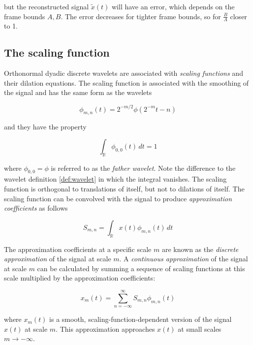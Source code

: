 but the reconstructed signal $\tilde{x}(t)$ will have an error, which depends on the frame bounds $A, B$. The error decreases for tighter frame bounds, so 
for $\frac{B}{A}$ closer to 1.

\subsection{The scaling function}
Orthonormal dyadic discrete wavelets are associated with \textit{scaling functions} and their dilation equations. The scaling function is associated with the smoothing of 
the signal and has the same form as the wavelets

\begin{equation}
    \phi_{m, n}(t) = 2^{-m/2} \phi(2^{-m}t - n)
    \label{eq:scal_func}
\end{equation}

and they have the property

\begin{equation}
    \int_{\mathbb{R}} \phi_{0,0}(t) \,dt = 1
\end{equation}

where $\phi_{0,0} = \phi$ is referred to as the \textit{father wavelet}. Note the difference to the wavelet definition \ref{def:wavelet} in which the integral vanishes.
The scaling function is orthogonal to translations of itself, but not to dilations of itself. The scaling function can be convolved with the signal to
produce \textit{approximation coefficients} as follows

\begin{equation}
    S_{m, n} = \int_{\mathbb{R}} x(t) \phi_{m, n}(t) \, dt
    \label{eq:approx_coef}
\end{equation}

The approximation coefficients at a specific scale $m$ are known as the \textit{discrete approximation} of the signal at scale $m$. A \textit{continuous approximation} of
the signal at scale $m$ can be calculated by summing a sequence of scaling functions at this scale multiplied by the approximation coefficients:

\begin{equation}
    x_{m}(t) = \sum_{n=-\infty}^{\infty} S_{m, n} \phi_{m, n}(t)
    \label{eq:contin_approx}
\end{equation}

where $x_m(t)$ is a smooth, scaling-function-dependent version of the signal $x(t)$ at scale $m$. This approximation approaches $x(t)$ at small scales $m \rightarrow - \infty$.

